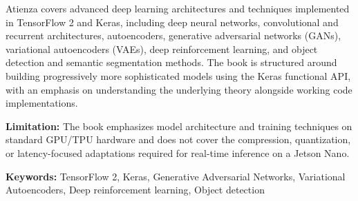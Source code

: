 {
	Atienza \cite{Atienza:2020} covers advanced deep learning architectures and techniques implemented in TensorFlow 2 and Keras, including deep neural networks, convolutional and recurrent architectures, autoencoders, generative adversarial networks (GANs), variational autoencoders (VAEs), deep reinforcement learning, and object detection and semantic segmentation methods. The book is structured around building progressively more sophisticated models using the Keras functional API, with an emphasis on understanding the underlying theory alongside working code implementations.
	
	\bigskip
	\textbf{Limitation:} The book emphasizes model architecture and training techniques on standard GPU/TPU hardware and does not cover the compression, quantization, or latency-focused adaptations required for real-time inference on a Jetson Nano.
	
	\scriptsize{\textbf{Keywords:} TensorFlow 2, Keras, Generative Adversarial Networks, Variational Autoencoders, Deep reinforcement learning, Object detection}
}
